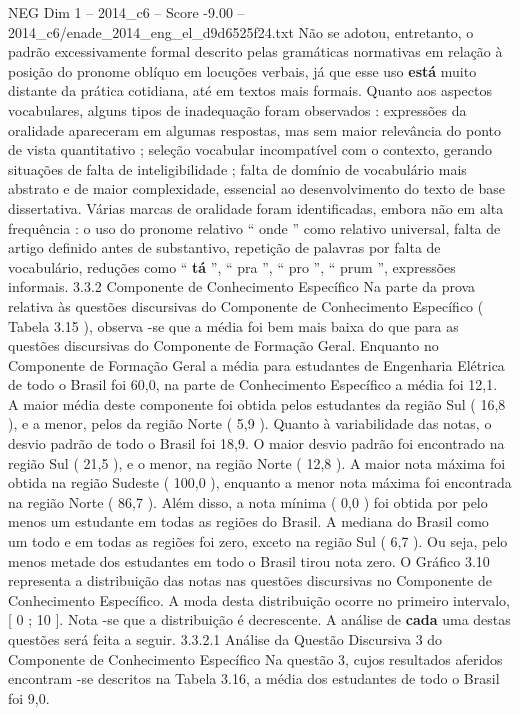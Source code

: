 \begin{textsample}{NEG Dim 1 – 2014\_c6 – Score -9.00 – 2014\_c6/enade\_2014\_eng\_el\_d9d6525f24.txt}
Não se adotou, entretanto, o padrão excessivamente formal descrito pelas gramáticas normativas em relação à posição do pronome oblíquo em locuções verbais, já que esse uso \textbf{está} muito distante da prática cotidiana, até em textos mais formais.
Quanto aos aspectos vocabulares, alguns tipos de inadequação foram observados : expressões da oralidade apareceram em algumas respostas, mas sem maior relevância do ponto de vista quantitativo ; seleção vocabular incompatível com o contexto, gerando situações de falta de inteligibilidade ; falta de domínio de vocabulário mais abstrato e de maior complexidade, essencial ao desenvolvimento do texto de base dissertativa.
Várias marcas de oralidade foram identificadas, embora não em alta frequência : o uso do pronome relativo “ onde ” como relativo universal, falta de artigo definido antes de substantivo, repetição de palavras por falta de vocabulário, reduções como “ \textbf{tá} ”, “ pra ”, “ pro ”, “ prum ”, expressões informais. 3.3.2 Componente de Conhecimento Específico Na parte da prova relativa às questões discursivas do Componente de Conhecimento Específico ( Tabela 3.15 ), observa -se que a média foi bem mais baixa do que para as questões discursivas do Componente de Formação Geral.
Enquanto no Componente de Formação Geral a média para estudantes de Engenharia Elétrica de todo o Brasil foi 60,0, na parte de Conhecimento Específico a média foi 12,1.
A maior média deste componente foi obtida pelos estudantes da região Sul ( 16,8 ), e a menor, pelos da região Norte ( 5,9 ).
Quanto à variabilidade das notas, o desvio padrão de todo o Brasil foi 18,9.
O maior desvio padrão foi encontrado na região Sul ( 21,5 ), e o menor, na região Norte ( 12,8 ).
A maior nota máxima foi obtida na região Sudeste ( 100,0 ), enquanto a menor nota máxima foi encontrada na região Norte ( 86,7 ).
Além disso, a nota mínima ( 0,0 ) foi obtida por pelo menos um estudante em todas as regiões do Brasil.
A mediana do Brasil como um todo e em todas as regiões foi zero, exceto na região Sul ( 6,7 ).
Ou seja, pelo menos metade dos estudantes em todo o Brasil tirou nota zero.
O Gráfico 3.10 representa a distribuição das notas nas questões discursivas no Componente de Conhecimento Específico.
A moda desta distribuição ocorre no primeiro intervalo, [ 0 ; 10 ].
Nota -se que a distribuição é decrescente.
A análise de \textbf{cada} uma destas questões será feita a seguir. 3.3.2.1 Análise da Questão Discursiva 3 do Componente de Conhecimento Específico Na questão 3, cujos resultados aferidos encontram -se descritos na Tabela 3.16, a média dos estudantes de todo o Brasil foi 9,0.

\end{textsample}
